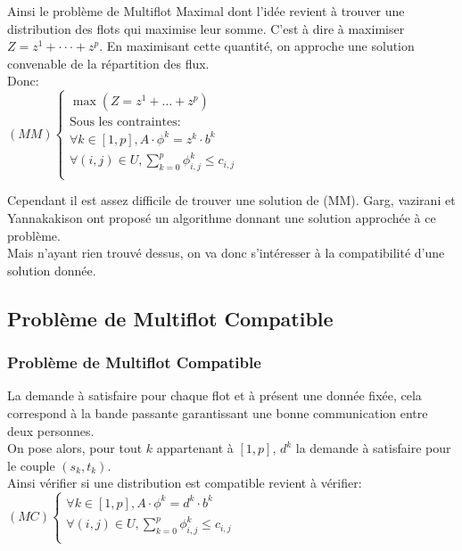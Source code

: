 \documentclass[t,10pt]{beamer}
\begin{document}
    \begin{frame}
        Ainsi le problème de Multiflot Maximal dont l'idée revient à trouver une distribution des flots qui maximise leur somme.
        C'est à dire à maximiser $Z = z^{1} + \cdot \cdot \cdot + z^{p}$. En maximisant cette quantité,
        on approche une solution convenable de la répartition des flux.
        \\
        Donc:
        \\
        \vspace{0,5cm}
        $(MM)
        \left\{
        \begin{array}{ll}
            \max(Z = z^{1} + \dots + z^{p}) \\
            \text{Sous les contraintes:} \\
            \forall k \in [1,p], A \cdot \phi^k = z^k \cdot b^k \\
            \forall (i,j) \in U, \displaystyle \sum_{k=0}^{p} \phi_{i,j}^{k} \le c_{i,j} \\
        \end{array}$
        \\
        \vspace{0.5cm}

        Cependant il est assez difficile de trouver une solution de (MM).
        Garg, vazirani et Yannakakison ont proposé un algorithme donnant une solution approchée à ce problème.\\
        Mais n'ayant rien trouvé dessus, on va donc s'intéresser à la compatibilité d'une solution donnée.
    \end{frame}

    \subsection{Problème de Multiflot Compatible}
    \begin{frame}\frametitle{\small Problème de Multiflot Compatible}
        La demande à satisfaire pour chaque flot et à présent une donnée fixée,
        cela correspond à la bande passante garantissant une bonne communication entre deux personnes. \\
        On pose alors, pour tout $k$ appartenant à $[1,p]$, $d^{k}$ la demande à satisfaire pour le couple $(s_{k}, t_{k})$. \\
        Ainsi vérifier si une distribution est compatible revient à vérifier: \\
        \vspace{0.3cm}
         $(MC)
        \left\{
        \begin{array}{ll}
            \forall k \in [1,p], A \cdot \phi^k = d^k \cdot b^k \\
            \forall (i,j) \in U, \displaystyle \sum_{k=0}^{p} \phi_{i,j}^{k} \le c_{i,j} \\
        \end{array}$
    \end{frame}
\end{document}
